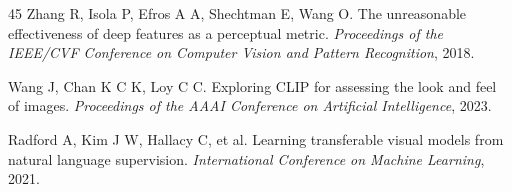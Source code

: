 \documentclass[times,twocolumn,final]{elsarticle}
\begin{document}
\begin{thebibliography}{45}
Zhang R, Isola P, Efros A A, Shechtman E, Wang O. The unreasonable effectiveness of deep features as a perceptual metric. \textit{Proceedings of the IEEE/CVF Conference on Computer Vision and Pattern Recognition}, 2018.

Wang J, Chan K C K, Loy C C. Exploring CLIP for assessing the look and feel of images. \textit{Proceedings of the AAAI Conference on Artificial Intelligence}, 2023.

Radford A, Kim J W, Hallacy C, et al. Learning transferable visual models from natural language supervision. \textit{International Conference on Machine Learning}, 2021.

\end{thebibliography}
\end{document}
